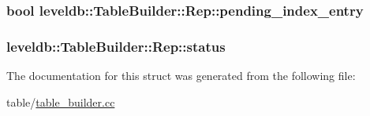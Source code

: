\hypertarget{structleveldb_1_1_table_builder_1_1_rep_a56e14221a2e29941a37d208f99770c20}{
\subsubsection[{pending\-\_\-index\-\_\-entry}]{\setlength{\rightskip}{0pt plus 5cm}bool leveldb\-::\-Table\-Builder\-::\-Rep\-::pending\-\_\-index\-\_\-entry}}\label{structleveldb_1_1_table_builder_1_1_rep_a56e14221a2e29941a37d208f99770c20}
\hypertarget{structleveldb_1_1_table_builder_1_1_rep_a8345f0a97587121457fb180a1fb081dd}{
\subsubsection[{status}]{ leveldb\-::\-Table\-Builder\-::\-Rep\-::status}}\label{structleveldb_1_1_table_builder_1_1_rep_a8345f0a97587121457fb180a1fb081dd}


The documentation for this struct was generated from the following file\-:\begin{DoxyCompactItemize}
\item 
table/\hyperlink{table__builder_8cc}{table\-\_\-builder.\-cc}\end{DoxyCompactItemize}
